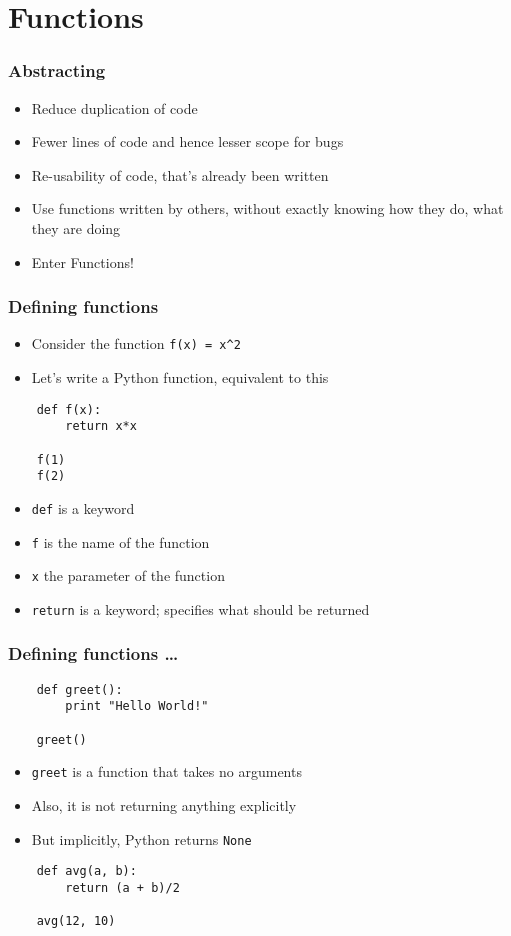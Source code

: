 \section{Functions}

\begin{frame}[fragile]
  \frametitle{Abstracting}
  \begin{itemize}
  \item Reduce duplication of code
  \item Fewer lines of code and hence lesser scope for bugs
  \item Re-usability of code, that's already been written
  \item Use functions written by others, without exactly knowing how
    they do, what they are doing
  \item \alert{Enter Functions!}
  \end{itemize}
\end{frame}


\begin{frame}[fragile]
  \frametitle{Defining functions}
  \begin{itemize}
  \item Consider the function \texttt{f(x) = x\textasciicircum{}2}
  \item Let's write a Python function, equivalent to this
  \end{itemize}
  \begin{lstlisting}
    def f(x):
        return x*x

    f(1)
    f(2)
  \end{lstlisting}
  \begin{itemize}
  \item \texttt{def} is a keyword  
  \item \texttt{f} is the name of the function 
  \item \texttt{x} the parameter of the function
  \item \texttt{return} is a keyword; specifies what should be
    returned
  \end{itemize}
\end{frame}

\begin{frame}[fragile]
  \frametitle{Defining functions \ldots}
  \begin{lstlisting}
    def greet():
        print "Hello World!"

    greet()
  \end{lstlisting}
  \begin{itemize}
  \item \texttt{greet} is a function that takes no arguments
  \item Also, it is not returning anything explicitly
  \item But implicitly, Python returns \texttt{None}
  \end{itemize}
  \begin{lstlisting}
    def avg(a, b):
        return (a + b)/2
        
    avg(12, 10)
  \end{lstlisting}
\end{frame}

